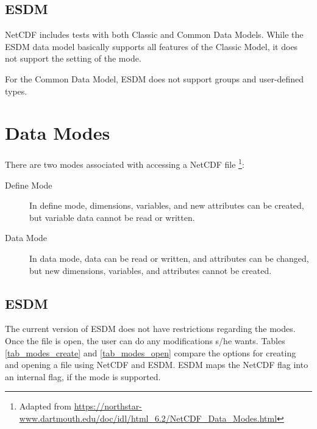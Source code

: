 \subsection{ESDM}

NetCDF includes tests with both Classic and Common Data Models.
While the ESDM data model basically supports all features of the Classic Model, it does not support the setting of the mode.

For the Common Data Model, ESDM does not support groups and user-defined types.


\section{Data Modes}

{\itshape

There are two modes associated with accessing a NetCDF file \footnote{Adapted from \url{https://northstar-www.dartmouth.edu/doc/idl/html_6.2/NetCDF_Data_Modes.html}}:

\begin{description}

\item[Define Mode] In define mode, dimensions, variables, and new attributes can be created, but variable data cannot be read or written.

\item[Data Mode] In data mode, data can be read or written, and attributes can be changed, but new dimensions, variables, and attributes cannot be created.

\end{description}

}

\subsection{ESDM}

The current version of ESDM does not have restrictions regarding the modes.
Once the file is open, the user can do any modifications s/he wants.
Tables \ref{tab_modes_create} and \ref{tab_modes_open} compare the options for creating and opening a file using NetCDF and ESDM.
ESDM maps the NetCDF flag into an internal flag, if the mode is supported.

